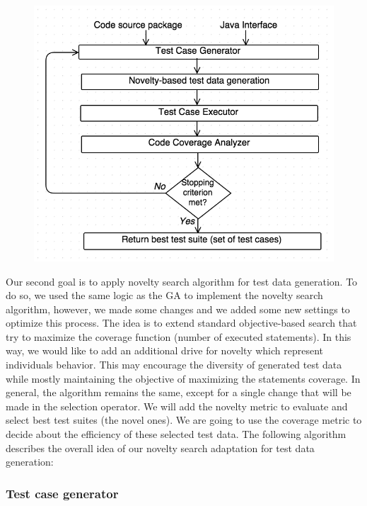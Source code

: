 \documentclass[conference]{IEEEtran}
\begin{document}
\begin{figure}[h]
	\centering
	\includegraphics[scale=0.5]{Ressources/ApproachOverview.png}
	
\end{figure}

Our second goal is to apply novelty search algorithm for test data generation. To do so, we used the same logic as the GA to implement the novelty search algorithm, however, we made some changes and we added some new settings to optimize this process. 
The idea is to extend standard objective-based search that try to maximize the coverage function (number of executed statements). In this way, we would like to add an additional drive for novelty which represent individuals behavior. This may encourage the diversity of generated test data while mostly maintaining the objective of maximizing the statements coverage. 
In general, the algorithm remains the same, except for a single change that will be made in the selection operator. We will add the novelty metric to evaluate and select best test suites (the novel ones). We are going to use the coverage metric to decide about the efficiency of these selected test data.
The following algorithm describes the overall idea of our novelty search adaptation for test data generation:


\subsubsection{Test case generator}
\end{document}
